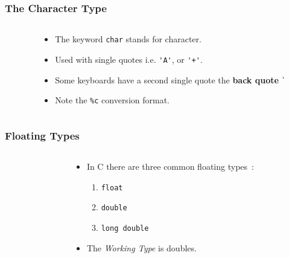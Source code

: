 \begin{frame}[fragile]
\frametitle{The Character Type}

\begin{columns}
\begin{column}{0.55\textwidth}

\end{column}

\begin{column}{0.45\textwidth}
\begin{itemize}[<+->]
\item The  keyword \verb+char+ stands for character.
\item Used with single quotes i.e.
\verb^'A'^, or \verb^'+'^.
\item Some keyboards have a second single quote the {\bf back quote} \verb^`^
\item Note the \verb+%c+ conversion format.
\end{itemize}
\end{column}

\end{columns}
\end{frame}


\begin{frame}[fragile]
\frametitle{Floating Types}
\begin{columns}
\begin{column}{0.55\textwidth}

\end{column}

\begin{column}{0.45\textwidth}
\begin{itemize}[<+->]
\item In C there are three common floating types~:
    \begin{enumerate}[<+->]
        \item \verb+float+
        \item \verb+double+
        \item \verb+long double+
    \end{enumerate}
\item The {\it Working Type} is doubles.
\end{itemize}
\end{column}

\end{columns}
\end{frame}


